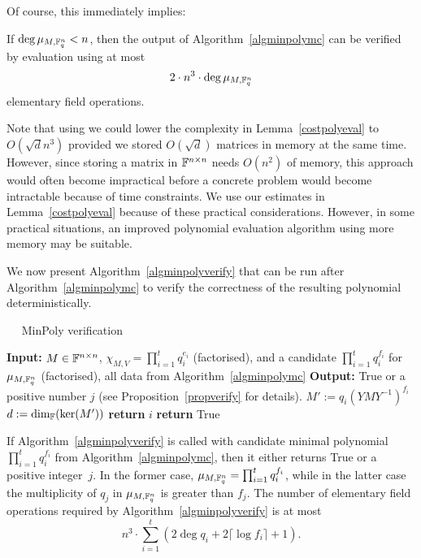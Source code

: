 \smallskip
Of course, this immediately implies:

\begin{Cor}
If $\deg \mu_{M,\mathbb{F}_q^n} < n$, then the output of Algorithm~\ref{algminpolymc} 
can be verified by evaluation using at most 
\[ 2\cdot n^3 \cdot \deg \mu_{M,\mathbb{F}_q^n} \] 
elementary field operations.
\end{Cor}

\begin{Rem}
Note that using \cite[Theorem 2]{AC97} we could lower the complexity
in Lemma~\ref{costpolyeval} to $O(\sqrt d n^3)$ provided we 
stored $O(\sqrt d)$ matrices in memory at the same time. However, since
storing a matrix in $\mathbb{F}^{n \times n}$ needs $O(n^2)$ of memory, this
approach would often become impractical before  a
concrete problem would become intractable because of time constraints. 
We use our estimates in Lemma~\ref{costpolyeval} because of
these practical considerations.
However, in some practical situations, an improved polynomial evaluation
algorithm using more memory may be suitable.
\end{Rem}

We now present Algorithm~\ref{algminpolyverify} that can be run after
Algorithm~\ref{algminpolymc} to verify the correctness of the resulting polynomial
deterministically.

\begin{algorithm}
\caption{$\quad$ \sc MinPoly verification}
\label{algminpolyverify}
\begin{algorithmic}
\STATE \textbf{Input:} $M \in \mathbb{F}^{n \times n}$, $\chi_{M,V} = \prod_{i=1}^t q_i^{e_i}$ (factorised), 
and a candidate $\prod_{i=1}^t q_i^{f_i}$ for $\mu_{M,\mathbb{F}_q^n}$ (factorised),
all data from Algorithm~\ref{algminpolymc}
\STATE \textbf{Output:} {\sc True} or a positive number $j$ (see
Proposition~\ref{propverify} for details).
\vspace*{2mm}
        \STATE $M' := q_i(YMY^{-1})^{f_i}$
        \STATE $d := \dim_{\mathbb{F}}( \ker(M') )$
            \STATE \textbf{return} $i$
        \ENDIF
    \ENDIF
\ENDFOR
\STATE \textbf{return} {\sc True}
\end{algorithmic}
\end{algorithm}

\begin{Prop}
\label{propverify}\mbox{}

If Algorithm~\ref{algminpolyverify} is called with candidate minimal polynomial
$\prod_{i=1}^t q_i^{f_i}$ from Algorithm~\ref{algminpolymc}, 
then it either returns {\sc True} or a 
positive integer~$j$.
In the former case, $\mu_{M,\mathbb{F}_q^n}=\prod_{i=1}^t q_i^{f_i}$,
while in the latter case the
multiplicity of $q_j$ in  $\mu_{M,\mathbb{F}_q^n}$ is greater than $f_j$.
The number of elementary field operations required by 
Algorithm~\ref{algminpolyverify} is at most
\[ 
 n^3 \cdot \sum_{i=1}^t \left( 2\deg q_i + 2\lceil \log f_i \rceil+1 \right).
\] 
\end{Prop}

